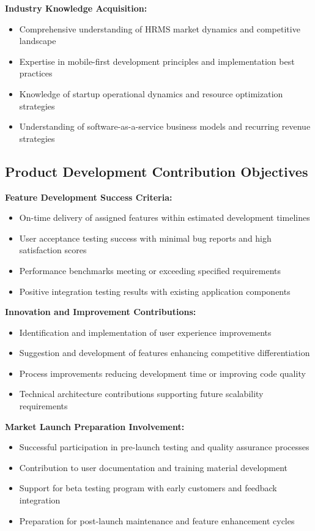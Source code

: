 \textbf{Industry Knowledge Acquisition:}
\begin{itemize}
    \item Comprehensive understanding of HRMS market dynamics and competitive landscape
    \item Expertise in mobile-first development principles and implementation best practices
    \item Knowledge of startup operational dynamics and resource optimization strategies
    \item Understanding of software-as-a-service business models and recurring revenue strategies
\end{itemize}

\subsection{Product Development Contribution Objectives}

\textbf{Feature Development Success Criteria:}
\begin{itemize}
    \item On-time delivery of assigned features within estimated development timelines
    \item User acceptance testing success with minimal bug reports and high satisfaction scores
    \item Performance benchmarks meeting or exceeding specified requirements
    \item Positive integration testing results with existing application components
\end{itemize}

\textbf{Innovation and Improvement Contributions:}
\begin{itemize}
    \item Identification and implementation of user experience improvements
    \item Suggestion and development of features enhancing competitive differentiation
    \item Process improvements reducing development time or improving code quality
    \item Technical architecture contributions supporting future scalability requirements
\end{itemize}

\textbf{Market Launch Preparation Involvement:}
\begin{itemize}
    \item Successful participation in pre-launch testing and quality assurance processes
    \item Contribution to user documentation and training material development
    \item Support for beta testing program with early customers and feedback integration
    \item Preparation for post-launch maintenance and feature enhancement cycles
\end{itemize}

